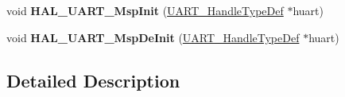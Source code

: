 \begin{DoxyCompactItemize}
\item 
\mbox{\label{group___u_a_r_t___exported___functions___group1_ga0e553b32211877322f949b14801bbfa7}} 
void {\bfseries H\+A\+L\+\_\+\+U\+A\+R\+T\+\_\+\+Msp\+Init} (\hyperlink{struct_u_a_r_t___handle_type_def}{U\+A\+R\+T\+\_\+\+Handle\+Type\+Def} $\ast$huart)
\item 
\mbox{\label{group___u_a_r_t___exported___functions___group1_ga718f39804e3b910d738a0e1e46151188}} 
void {\bfseries H\+A\+L\+\_\+\+U\+A\+R\+T\+\_\+\+Msp\+De\+Init} (\hyperlink{struct_u_a_r_t___handle_type_def}{U\+A\+R\+T\+\_\+\+Handle\+Type\+Def} $\ast$huart)
\end{DoxyCompactItemize}


\subsection{Detailed Description}
